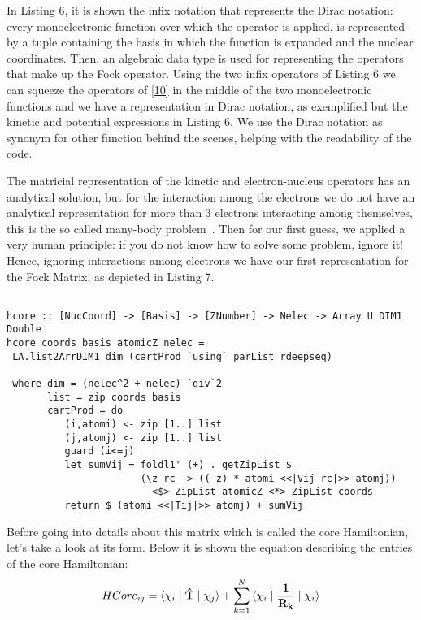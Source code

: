 \documentclass{tmr}
\begin{document}
In Listing 6, it is shown the infix notation that represents the Dirac notation:
every monoelectronic function over which the operator is applied,
is represented by a tuple containing the basis in which the function is expanded 
and the nuclear coordinates. Then, an algebraic data type is used for representing the
operators that make up the Fock operator. Using the two infix operators of Listing 6
we can squeeze the operators of \eqref{10} in the middle of the
two monoelectronic functions and we have a representation in Dirac notation, as exemplified
but the kinetic and potential expressions in Listing 6. We use the Dirac notation as
synonym for other function behind the scenes, helping with the readability of the code.


The matricial representation of the kinetic and electron-nucleus operators has 
an analytical solution, but for the interaction among the electrons we do not have 
an analytical representation for more than 3 electrons interacting among themselves, this is the so called
many-body problem~\cite{many-body}. Then for our first guess,
we applied a very human principle: if you do not know how to solve some problem, ignore it!
Hence, ignoring interactions among electrons we have our first representation for 
the Fock Matrix, as depicted in Listing 7.

\begin{lstlisting}[float,captionpos=b,belowcaptionskip=4pt, caption= Core Hamiltonian]

hcore :: [NucCoord] -> [Basis] -> [ZNumber] -> Nelec -> Array U DIM1 Double
hcore coords basis atomicZ nelec = 
 LA.list2ArrDIM1 dim (cartProd `using` parList rdeepseq)

 where dim = (nelec^2 + nelec) `div`2
       list = zip coords basis       
       cartProd = do
          (i,atomi) <- zip [1..] list
          (j,atomj) <- zip [1..] list
          guard (i<=j)
          let sumVij = foldl1' (+) . getZipList $
                       (\z rc -> ((-z) * atomi <<|Vij rc|>> atomj))
                         <$> ZipList atomicZ <*> ZipList coords
          return $ (atomi <<|Tij|>> atomj) + sumVij

\end{lstlisting}
 
\par Before going into details about this matrix which is called the
core Hamiltonian, let's take a look at its form. Below it is shown the equation
describing the entries of the core Hamiltonian:
\begin{equation}\label{16}
HCore_{ij} =\braket{\chi_{i} \mid \mathbf{\hat T} \mid \chi_{j}} + 
\sum_{k=1}^{N} \braket{\chi_{i} \mid \mathbf{\frac{1}{R_{k}}} \mid \chi_{i}} 
\end{equation}
\end{document}
